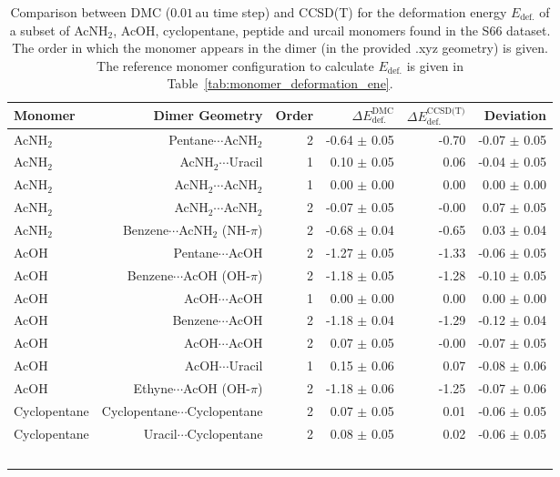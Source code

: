 \begin{table}
\caption{\label{tab:monomer_deformation_ene_validation}Comparison between DMC ($0.01\,$au time step) and CCSD(T) for the deformation energy $E_\text{def.}$ of a subset of AcNH$_2$, AcOH, cyclopentane, peptide and urcail monomers found in the S66 dataset. The order in which the monomer appears in the dimer (in the provided .xyz geometry) is given. The reference monomer configuration to calculate $E_\text{def.}$ is given in Table~\ref{tab:monomer_deformation_ene}.}
\begin{adjustbox}{center}
\begin{tabular}{lrrrrr}
\toprule
Monomer & Dimer Geometry & Order & $\Delta E_\text{def.}^\text{DMC}$ & $\Delta E_\text{def.}^\text{CCSD(T)}$ & Deviation \\ 
\midrule
AcNH$_2$ & Pentane$\cdots$AcNH$_2$ & 2 & -0.64 $\pm$ 0.05 & -0.70 & -0.07 $\pm$ 0.05 \\
AcNH$_2$ & AcNH$_2$$\cdots$Uracil & 1 & 0.10 $\pm$ 0.05 & 0.06 & -0.04 $\pm$ 0.05 \\
AcNH$_2$ & AcNH$_2$$\cdots$AcNH$_2$ & 1 & 0.00 $\pm$ 0.00 & 0.00 & 0.00 $\pm$ 0.00 \\
AcNH$_2$ & AcNH$_2$$\cdots$AcNH$_2$ & 2 & -0.07 $\pm$ 0.05 & -0.00 & 0.07 $\pm$ 0.05 \\
AcNH$_2$ & Benzene$\cdots$AcNH$_2$ (NH-$\pi$) & 2 & -0.68 $\pm$ 0.04 & -0.65 & 0.03 $\pm$ 0.04 \\
AcOH & Pentane$\cdots$AcOH & 2 & -1.27 $\pm$ 0.05 & -1.33 & -0.06 $\pm$ 0.05 \\
AcOH & Benzene$\cdots$AcOH (OH-$\pi$) & 2 & -1.18 $\pm$ 0.05 & -1.28 & -0.10 $\pm$ 0.05 \\
AcOH & AcOH$\cdots$AcOH & 1 & 0.00 $\pm$ 0.00 & 0.00 & 0.00 $\pm$ 0.00 \\
AcOH & Benzene$\cdots$AcOH & 2 & -1.18 $\pm$ 0.04 & -1.29 & -0.12 $\pm$ 0.04 \\
AcOH & AcOH$\cdots$AcOH & 2 & 0.07 $\pm$ 0.05 & -0.00 & -0.07 $\pm$ 0.05 \\
AcOH & AcOH$\cdots$Uracil & 1 & 0.15 $\pm$ 0.06 & 0.07 & -0.08 $\pm$ 0.06 \\
AcOH & Ethyne$\cdots$AcOH (OH-$\pi$) & 2 & -1.18 $\pm$ 0.06 & -1.25 & -0.07 $\pm$ 0.06 \\
Cyclopentane & Cyclopentane$\cdots$Cyclopentane & 2 & 0.07 $\pm$ 0.05 & 0.01 & -0.06 $\pm$ 0.05 \\
Cyclopentane & Uracil$\cdots$Cyclopentane & 2 & 0.08 $\pm$ 0.05 & 0.02 & -0.06 $\pm$ 0.05 \\
$$
\end{tabular}
\end{adjustbox}
\end{table}

